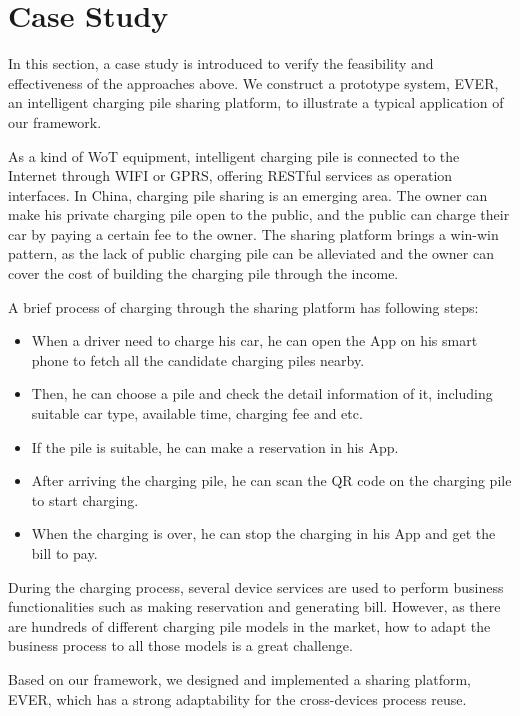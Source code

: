 \section{Case Study}
\label{CaseStudy}
In this section, a case study is introduced to verify the feasibility and effectiveness of the approaches above. We construct a prototype system, EVER, an intelligent charging pile sharing platform, to illustrate a typical application of our framework. 

As a kind of WoT equipment, intelligent charging pile is connected to the Internet through WIFI or GPRS, offering RESTful services as operation interfaces. In China, charging pile sharing is an emerging area. The owner can make his private charging pile open to the public, and the public can charge their car by paying a certain fee to the owner. The sharing platform brings a win-win pattern, as the lack of public charging pile can be alleviated and the owner can cover the cost of building the charging pile through the income. 

A brief process of charging through the sharing platform has following steps:
\begin{itemize}
\setlength{\itemsep}{1pt}
\setlength{\parskip}{0pt}
\setlength{\parsep}{0pt}
\item When a driver need to charge his car, he can open the App on his smart phone to fetch all the candidate charging piles nearby. 
\item Then, he can choose a pile and check the detail information of it, including suitable car type, available time, charging fee and etc. 
\item If the pile is suitable, he can make a reservation in his App. 
\item After arriving the charging pile, he can scan the QR code on the charging pile to start charging. 
\item When the charging is over, he can stop the charging in his App and get the bill to pay. 
\end{itemize}

During the charging process, several device services are used to perform business functionalities such as making reservation and generating bill. However, as there are hundreds of different charging pile models in the market, how to adapt the business process to all those models is a great challenge. 

Based on our framework, we designed and implemented a sharing platform, EVER, which has a strong adaptability for the cross-devices process reuse. 

